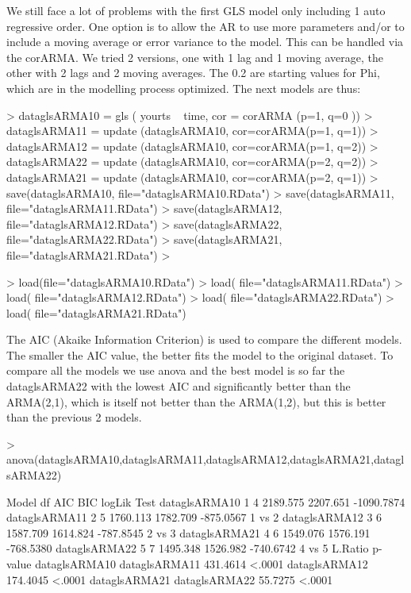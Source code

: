 \documentclass[10pt, a4paper]{article} %
\begin{document}
We still face a lot of problems with the first GLS model only including 1 auto regressive order. 
One option is to allow the AR to use more parameters and/or to include a moving average or error variance to the model. This can be handled via the corARMA. We tried 2 versions, one with 1 lag and 1 moving average, the other with 2 lags and 2 moving averages.
The 0.2 are starting values for Phi, which are in the modelling process optimized.
The next models are thus:
\begin{Schunk}
\begin{Sinput}
> dataglsARMA10 = gls ( yourts ~ time, cor = corARMA (p=1, q=0 ))
> dataglsARMA11 = update (dataglsARMA10, cor=corARMA(p=1, q=1))
> dataglsARMA12 = update (dataglsARMA10, cor=corARMA(p=1, q=2))
> dataglsARMA22 = update (dataglsARMA10, cor=corARMA(p=2, q=2))
> dataglsARMA21 = update (dataglsARMA10, cor=corARMA(p=2, q=1))
> save(dataglsARMA10, file="dataglsARMA10.RData")
> save(dataglsARMA11, file="dataglsARMA11.RData")
> save(dataglsARMA12, file="dataglsARMA12.RData")
> save(dataglsARMA22, file="dataglsARMA22.RData")
> save(dataglsARMA21, file="dataglsARMA21.RData")
> 
\end{Sinput}
\end{Schunk}

\begin{Schunk}
\begin{Sinput}
> load(file="dataglsARMA10.RData")
> load( file="dataglsARMA11.RData")
> load( file="dataglsARMA12.RData")
> load( file="dataglsARMA22.RData")
> load( file="dataglsARMA21.RData")
\end{Sinput}
\end{Schunk}

The AIC (Akaike Information Criterion) is used to compare the different models. The smaller the AIC value, the better fits the model to the original dataset.  
To compare all the models we use anova and the best model is so far the dataglsARMA22 with the lowest AIC and significantly better than the ARMA(2,1), which is itself not better than the ARMA(1,2), but this is better than the previous 2 models. 

\begin{Schunk}
\begin{Sinput}
> anova(dataglsARMA10,dataglsARMA11,dataglsARMA12,dataglsARMA21,dataglsARMA22)
\end{Sinput}
\begin{Soutput}
              Model df      AIC      BIC     logLik   Test
dataglsARMA10     1  4 2189.575 2207.651 -1090.7874       
dataglsARMA11     2  5 1760.113 1782.709  -875.0567 1 vs 2
dataglsARMA12     3  6 1587.709 1614.824  -787.8545 2 vs 3
dataglsARMA21     4  6 1549.076 1576.191  -768.5380       
dataglsARMA22     5  7 1495.348 1526.982  -740.6742 4 vs 5
               L.Ratio p-value
dataglsARMA10                 
dataglsARMA11 431.4614  <.0001
dataglsARMA12 174.4045  <.0001
dataglsARMA21                 
dataglsARMA22  55.7275  <.0001
\end{Soutput}
\end{Schunk}
\end{document}
